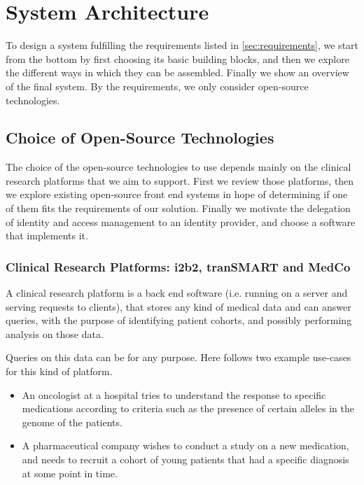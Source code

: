 \chapter{System Architecture}
\label{sec:sysarchitecture}

To design a system fulfilling the requirements listed in \ref{sec:requirements}, we start from the bottom by first choosing its basic building blocks, and then we explore the different ways in which they can be assembled.
Finally we show an overview of the final system.
By the requirements, we only consider open-source technologies.


\section{Choice of Open-Source Technologies}

The choice of the open-source technologies to use depends mainly on the clinical research platforms that we aim to support.
First we review those platforms, then we explore existing open-source front end systems in hope of determining if one of them fits the requirements of our solution.
Finally we motivate the delegation of identity and access management to an identity provider, and choose a software that implements it.

\subsection{Clinical Research Platforms: i2b2, tranSMART and MedCo}

A clinical research platform is a back end software (i.e. running on a server and serving requests to clients), that stores any kind of medical data and can answer queries, with the purpose of identifying patient cohorts, and possibly performing analysis on those data.

Queries on this data can be for any purpose. 
Here follows two example use-cases for this kind of platform.
\begin{itemize}
    \item An oncologist at a hospital tries to understand the response to specific medications according to criteria such as the presence of certain alleles in the genome of the patients.
    \item A pharmaceutical company wishes to conduct a study on a new medication, and needs to recruit a cohort of young patients that had a specific diagnosis at some point in time.
\end{itemize}

